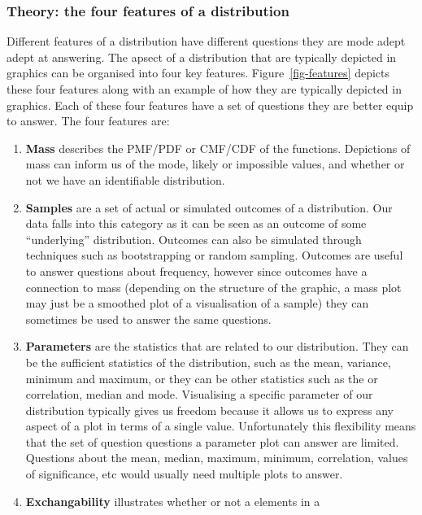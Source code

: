 \documentclass[
  letterpaper,
  DIV=11,
  numbers=noendperiod]{scrartcl}
\begin{document}
\hypertarget{theory-the-four-features-of-a-distribution}{%
\subsubsection{Theory: the four features of a
distribution}\label{theory-the-four-features-of-a-distribution}}

Different features of a distribution have different questions they are
mode adept adept at answering. The apsect of a distribution that are
typically depicted in graphics can be organised into four key features.
Figure~\ref{fig-features} depicts these four features along with an
example of how they are typically depicted in graphics. Each of these
four features have a set of questions they are better equip to answer.
The four features are:

\begin{enumerate}
\def\labelenumi{\arabic{enumi})}
\item
  \textbf{Mass} describes the PMF/PDF or CMF/CDF of the functions.
  Depictions of mass can inform us of the mode, likely or impossible
  values, and whether or not we have an identifiable distribution.
\item
  \textbf{Samples} are a set of actual or simulated outcomes of a
  distribution. Our data falls into this category as it can be seen as
  an outcome of some ``underlying'' distribution. Outcomes can also be
  simulated through techniques such as bootstrapping or random sampling.
  Outcomes are useful to answer questions about frequency, however since
  outcomes have a connection to mass (depending on the structure of the
  graphic, a mass plot may just be a smoothed plot of a visualisation of
  a sample) they can sometimes be used to answer the same questions.
\item
  \textbf{Parameters} are the statistics that are related to our
  distribution. They can be the sufficient statistics of the
  distribution, such as the mean, variance, minimum and maximum, or they
  can be other statistics such as the or correlation, median and mode.
  Visualising a specific parameter of our distribution typically gives
  us freedom because it allows us to express any aspect of a plot in
  terms of a single value. Unfortunately this flexibility means that the
  set of question questions a parameter plot can answer are limited.
  Questions about the mean, median, maximum, minimum, correlation,
  values of significance, etc would usually need multiple plots to
  answer.
\item
  \textbf{Exchangability} illustrates whether or not a elements in a

\end{enumerate}
\end{document}
